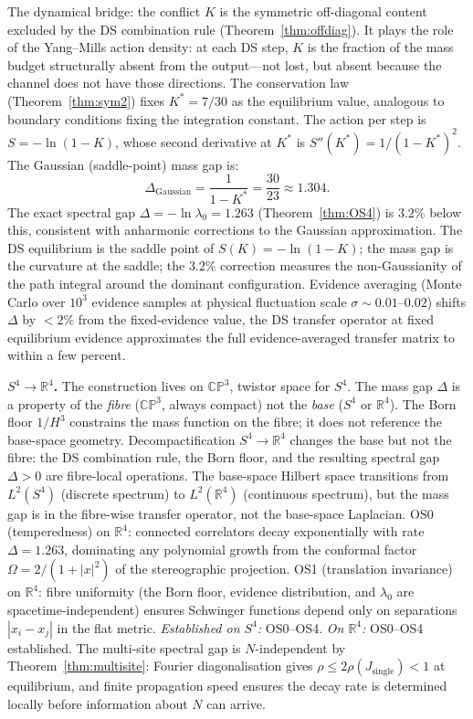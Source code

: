 \documentclass[11pt,a4paper]{article}
\theoremstyle{definition}
\theoremstyle{remark}
\newcommand{\CP}{\mathbb{CP}}
\newcommand{\R}{\mathbb{R}}
\begin{document}
The dynamical bridge: the conflict $K$ is the symmetric off-diagonal content excluded by the DS combination rule (Theorem~\ref{thm:offdiag}). It plays the role of the Yang--Mills action density: at each DS step, $K$ is the fraction of the mass budget structurally absent from the output---not lost, but absent because the channel does not have those directions. The conservation law (Theorem~\ref{thm:sym2}) fixes $K^*=7/30$ as the equilibrium value, analogous to boundary conditions fixing the integration constant. The action per step is $S=-\ln(1-K)$, whose second derivative at $K^*$ is $S''(K^*)=1/(1-K^*)^2$. The Gaussian (saddle-point) mass gap is:
\begin{equation}\label{eq:saddle}
\Delta_{\mathrm{Gaussian}}=\frac{1}{1-K^*}=\frac{30}{23}\approx 1.304.
\end{equation}
The exact spectral gap $\Delta=-\ln\lambda_0=1.263$ (Theorem~\ref{thm:OS4}) is $3.2\%$ below this, consistent with anharmonic corrections to the Gaussian approximation. The DS equilibrium is the saddle point of $S(K)=-\ln(1-K)$; the mass gap is the curvature at the saddle; the $3.2\%$ correction measures the non-Gaussianity of the path integral around the dominant configuration. Evidence averaging (Monte Carlo over $10^3$ evidence samples at physical fluctuation scale $\sigma\sim 0.01$--$0.02$) shifts $\Delta$ by $<2\%$ from the fixed-evidence value, the DS transfer operator at fixed equilibrium evidence approximates the full evidence-averaged transfer matrix to within a few percent.

\textbf{$S^4\to\R^4$.} The construction lives on $\CP^3$, twistor space for $S^4$. The mass gap $\Delta$ is a property of the \emph{fibre} ($\CP^3$, always compact) not the \emph{base} ($S^4$ or $\R^4$). The Born floor $1/H^3$ constrains the mass function on the fibre; it does not reference the base-space geometry. Decompactification $S^4\to\R^4$ changes the base but not the fibre: the DS combination rule, the Born floor, and the resulting spectral gap $\Delta>0$ are fibre-local operations. The base-space Hilbert space transitions from $L^2(S^4)$ (discrete spectrum) to $L^2(\R^4)$ (continuous spectrum), but the mass gap is in the fibre-wise transfer operator, not the base-space Laplacian. OS0 (temperedness) on $\R^4$: connected correlators decay exponentially with rate $\Delta=1.263$, dominating any polynomial growth from the conformal factor $\Omega=2/(1+|x|^2)$ of the stereographic projection. OS1 (translation invariance) on $\R^4$: fibre uniformity (the Born floor, evidence distribution, and $\lambda_0$ are spacetime-independent) ensures Schwinger functions depend only on separations $|x_i-x_j|$ in the flat metric. \emph{Established on $S^4$:} OS0--OS4. \emph{On $\R^4$:} OS0--OS4 established. The multi-site spectral gap is $N$-independent by Theorem~\ref{thm:multisite}: Fourier diagonalisation gives $\rho\leq 2\rho(J_{\mathrm{single}})<1$ at equilibrium, and finite propagation speed ensures the decay rate is determined locally before information about $N$ can arrive.
\end{document}
